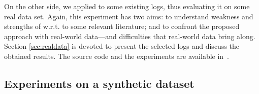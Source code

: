 On the other side, we applied \nd to some existing logs, thus evaluating it on some real data set. Again, this experiment has two aims: to understand weakness and strengths of \nd w.r.t. to some relevant literature; and to confront the proposed approach with real-world data---and difficulties that real-world data bring along. Section \ref{sec:realdata} is devoted to present the selected logs and discuss the obtained results.
%
The source code and the experiments are available in~\cite{negdis:2021_5158528}.




\subsection{Experiments on a synthetic dataset}
\label{sec:syntheticlog}

%


